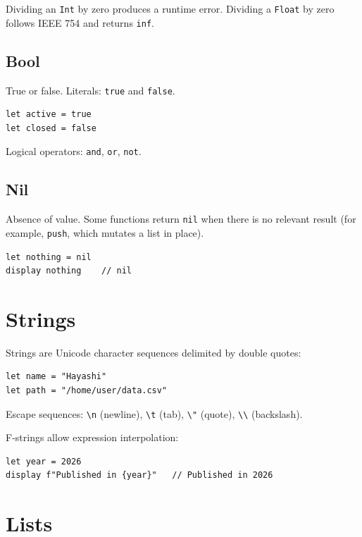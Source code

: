 \begin{nota}
  Dividing an \texttt{Int} by zero produces a runtime error. Dividing a
  \texttt{Float} by zero follows IEEE 754 and returns \texttt{inf}.
\end{nota}

\subsection{Bool}

True or false. Literals: \lstinline{true} and \lstinline{false}.

\begin{lstlisting}
let active = true
let closed = false
\end{lstlisting}

Logical operators: \lstinline{and}, \lstinline{or}, \lstinline{not}.

\subsection{Nil}

Absence of value. Some functions return \lstinline{nil} when there is no
relevant result (for example, \lstinline{push}, which mutates a list in
place).

\begin{lstlisting}
let nothing = nil
display nothing    // nil
\end{lstlisting}

\section{Strings}

Strings are Unicode character sequences delimited by double quotes:

\begin{lstlisting}
let name = "Hayashi"
let path = "/home/user/data.csv"
\end{lstlisting}

Escape sequences: \texttt{\textbackslash n} (newline),
\texttt{\textbackslash t} (tab),
\texttt{\textbackslash"} (quote),
\texttt{\textbackslash\textbackslash} (backslash).

F-strings allow expression interpolation:

\begin{lstlisting}
let year = 2026
display f"Published in {year}"   // Published in 2026
\end{lstlisting}

\section{Lists}

